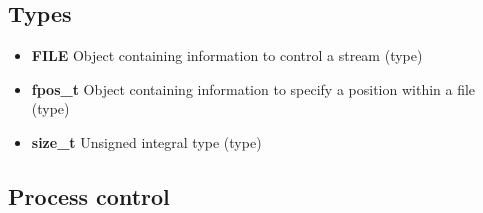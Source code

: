 \documentclass{report}
\begin{document}
    \bigbreak \noindent 
    \subsection{Types}
    \begin{itemize}
        \item \textbf{FILE}	Object containing information to control a stream (type)
        \item \textbf{fpos\_t}	Object containing information to specify a position within a file (type)
        \item \textbf{size\_t}	Unsigned integral type (type)
    \end{itemize}

    \pagebreak 
    \bigbreak \noindent 
    \subsection{Process control}
\end{document}
